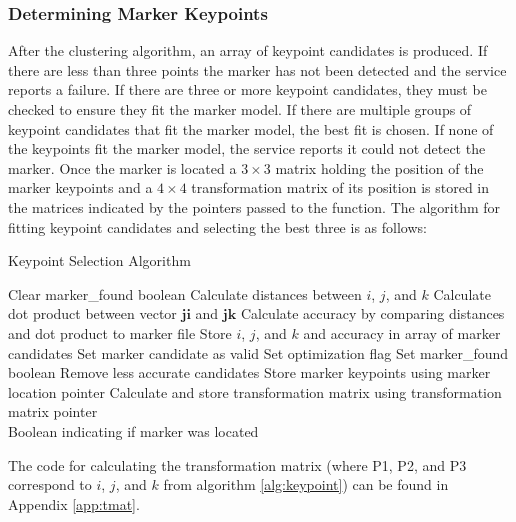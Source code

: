 \subsubsection{Determining Marker Keypoints}
After the clustering algorithm, an array of keypoint candidates is produced. If there are less than three points the marker has not been detected and the service reports a failure. If there are three or more keypoint candidates, they must be checked to ensure they fit the marker model. If there are multiple groups of keypoint candidates that fit the marker model, the best fit is chosen. If none of the keypoints fit the marker model, the service reports it could not detect the marker. Once the marker is located a $3\times3$ matrix holding the position of the marker keypoints and a $4\times4$ transformation matrix of its position is stored in the matrices indicated by the pointers passed to the function. The algorithm for fitting keypoint candidates and selecting the best three is as follows:
\begin{spacing}{0.8}
\begin{algorithm}[H]
\caption{Keypoint Selection Algorithm}
\label{alg:keypoint}
\begin{algorithmic}[1]
\begin{raggedright}
\State Clear marker\_found boolean
\State Calculate distances between $i$, $j$, and $k$
\State Calculate dot product between vector $\mathbf{ji}$ and $\mathbf{jk}$
\State Calculate accuracy by comparing distances and dot product to marker file
\State Store $i$, $j$, and $k$ and accuracy in array of marker candidates
\State Set marker candidate as valid
\State Set optimization flag
\EndIf
\EndIf
\EndIf
\EndFor
\EndFor
\EndFor
{}
\State Set marker\_found boolean
\State Remove less accurate candidates
\State Store marker keypoints using marker location pointer 
\State Calculate and store transformation matrix using transformation matrix pointer \
\EndIf
\EndFunction\\
\Return Boolean indicating if marker was located
\end{raggedright}
\end{algorithmic}
\end{algorithm}
\end{spacing}
The code for calculating the transformation matrix (where P1, P2, and P3 correspond to $i$, $j$, and $k$ from algorithm \ref{alg:keypoint}) can be found in Appendix \ref{app:tmat}.\\

